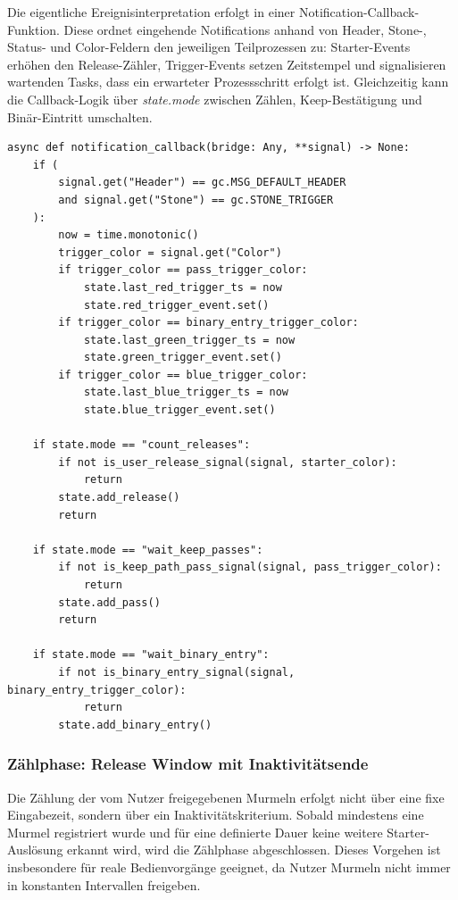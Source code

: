 Die eigentliche Ereignisinterpretation erfolgt in einer Notification-Callback-Funktion. Diese ordnet eingehende Notifications anhand von Header, Stone-, Status- und Color-Feldern den jeweiligen Teilprozessen zu: Starter-Events erhöhen den Release-Zähler, Trigger-Events setzen Zeitstempel und signalisieren wartenden Tasks, dass ein erwarteter Prozessschritt erfolgt ist. Gleichzeitig kann die Callback-Logik über \emph{state.mode} zwischen Zählen, Keep-Bestätigung und Binär-Eintritt umschalten.

\begin{listing}[ht]
\caption{Auszug: Notification-Callback zur Ereignisklassifikation und Rückmeldung}
\label{lst:notification_callback}
\begin{verbatim}
async def notification_callback(bridge: Any, **signal) -> None:
	if (
		signal.get("Header") == gc.MSG_DEFAULT_HEADER
		and signal.get("Stone") == gc.STONE_TRIGGER
	):
		now = time.monotonic()
		trigger_color = signal.get("Color")
		if trigger_color == pass_trigger_color:
			state.last_red_trigger_ts = now
			state.red_trigger_event.set()
		if trigger_color == binary_entry_trigger_color:
			state.last_green_trigger_ts = now
			state.green_trigger_event.set()
		if trigger_color == blue_trigger_color:
			state.last_blue_trigger_ts = now
			state.blue_trigger_event.set()

	if state.mode == "count_releases":
		if not is_user_release_signal(signal, starter_color):
			return
		state.add_release()
		return

	if state.mode == "wait_keep_passes":
		if not is_keep_path_pass_signal(signal, pass_trigger_color):
			return
		state.add_pass()
		return

	if state.mode == "wait_binary_entry":
		if not is_binary_entry_signal(signal, binary_entry_trigger_color):
			return
		state.add_binary_entry()
\end{verbatim}
\end{listing}

\subsubsection{Zählphase: Release Window mit Inaktivitätsende}
Die Zählung der vom Nutzer freigegebenen Murmeln erfolgt nicht über eine fixe Eingabezeit, sondern über ein Inaktivitätskriterium. Sobald mindestens eine Murmel registriert wurde und für eine definierte Dauer keine weitere Starter-Auslösung erkannt wird, wird die Zählphase abgeschlossen. Dieses Vorgehen ist insbesondere für reale Bedienvorgänge geeignet, da Nutzer Murmeln nicht immer in konstanten Intervallen freigeben.

